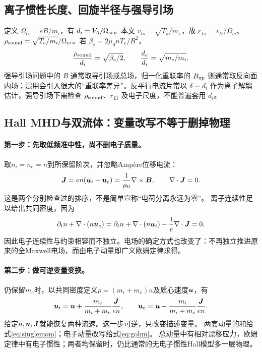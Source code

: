 \documentclass[UTF8,a4paper,11pt,openany,fontset=fandol]{ctexbook}
\begin{document}
\subsection{离子惯性长度、回旋半径与强导引场}
定义 $\Omega_{ci}=eB/m_i$，有 $d_i=V_{\!A}/\Omega_{ci}$。本文 $v_{ts}=\sqrt{T_s/m_s}$，故 $r_{Li}=v_{ti}/\Omega_{ci}$、$\rho_{\rm sound}=\sqrt{T_e/m_i}/\Omega_{ci}$。若 $\beta_e=2\mu_0nT_e/B^2$，
\begin{equation}{\rho_{\rm sound}\over d_i}=\sqrt{\beta_e/2},\qquad {d_e\over d_i}=\sqrt{m_e/m_i}.
\end{equation}
强导引场问题中的 $B$ 通常取导引场或总场，归一化重联率的 $B_{\rm up}$ 则通常取反向面内场；混用会引入很大的“重联率差异”。反平行电流片常以 $\delta\sim d_i$ 作为离子解耦估计，强导引场下需检查 $\rho_{\rm sound}$、$r_{Li}$ 及电子尺度，不能普遍套用 $d_i$。

\subsection{Hall MHD与双流体：变量改写不等于删掉物理}
\label{sec:twofluid-to-hall}

\paragraph{第一步：先取低频准中性，尚不删电子质量。}
取$n_i=n_e=n$到所保留阶次，并忽略Ampère位移电流：
\begin{equation}
 \bm{J}=en(\bm{u}_i-\bm{u}_e)=\frac1{\mu_0}\nabla\times\bm{B},\qquad
 \nabla\cdot\bm{J}=0.
\end{equation}
这是两个分别检查过的排序，不是简单宣称“电荷分离永远为零”。
离子连续性足以给出共同密度，因为
\begin{equation}
 \partial_tn+\nabla\cdot(n\bm{u}_e)
 =\partial_tn+\nabla\cdot(n\bm{u}_i)-\frac1e\nabla\cdot\bm{J}=0.
\end{equation}
因此电子连续性与约束相容而不独立。电场的确定方式也改变了：不再独立推进原来的全Maxwell电场，而由电子动量即广义欧姆定律求得。

\paragraph{第二步：做可逆变量变换。}
仍保留$m_e$时，以共同密度定义$\rho=(m_i+m_e)n$及质心速度$\bm{u}$，有
\begin{equation}
 \bm{u}_i=\bm{u}+\frac{m_e}{m_i+m_e}\frac{\bm{J}}{en},\qquad
 \bm{u}_e=\bm{u}-\frac{m_i}{m_i+m_e}\frac{\bm{J}}{en}.
\end{equation}
给定$n,\bm{u},\bm{J}$就能恢复两种流速。这一步可逆，只改变描述变量。
两套动量的和给式\eqref{eq:singlemom}；电子动量改写给式\eqref{eq:gohm}。
总动量中有相对漂移应力，欧姆定律中有电子惯性；两者均保留时，仍比通常的无电子惯性Hall模型多一层物理。
\end{document}
